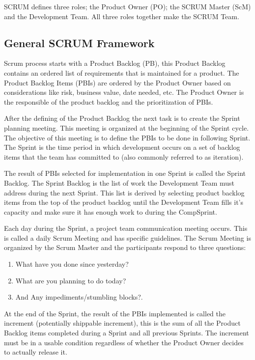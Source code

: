SCRUM defines three roles; the Product Owner (PO); the SCRUM Master (ScM) and the Development Team. All three roles together make the SCRUM Team.

\subsection{General SCRUM Framework}

Scrum process starts with a Product Backlog (PB), this Product Backlog contains an ordered list of requirements that is maintained for a product. The Product Backlog Items (PBIs) are ordered by the Product Owner based on considerations like risk, business value, date needed, etc. The Product Owner is the responsible of the product backlog and the prioritization of PBIs.

After the defining of the Product Backlog the next task is to create the Sprint planning meeting. This meeting is organized at the beginning of the Sprint cycle. The objective of this meeting is to define the PBIs to be done in following Sprint. The Sprint is the time period in which development occurs on a set of backlog items that the team has committed to (also commonly referred to as iteration). 

The result of PBIs selected for implementation in one Sprint is called the Sprint Backlog. The Sprint Backlog is the list of work the Development Team must address during the next Sprint. This list is derived by selecting product backlog items from the top of the product backlog until the Development Team fills it's capacity and make sure it has enough work to during the CompSprint.

Each day during the Sprint, a project team communication meeting occurs. This is called a daily Scrum Meeting and has specific guidelines. The Scrum Meeting is organized by the Scrum Master and the participants respond to three questions:
\begin{enumerate}
\item  What have you done since yesterday?
\item What are you planning to do today? 
\item And Any impediments/stumbling blocks?.
\end{enumerate}
At the end of the Sprint, the result of the PBIs implemented is called the increment (potentially shippable increment), this is the sum of all the Product Backlog items completed during a Sprint and all previous Sprints. The increment must be in a usable condition regardless of whether the Product Owner decides to actually release it.

